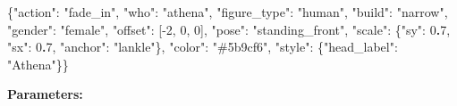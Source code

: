 \documentclass[
  12pt,
  letterpaper,
]{book}
\newenvironment{Shaded}{}{}
\newcommand{\DataTypeTok}[1]{\textcolor[rgb]{0.56,0.13,0.00}{#1}}
\newcommand{\DecValTok}[1]{\textcolor[rgb]{0.25,0.63,0.44}{#1}}
\newcommand{\ErrorTok}[1]{\textcolor[rgb]{1.00,0.00,0.00}{\textbf{#1}}}
\newcommand{\FunctionTok}[1]{\textcolor[rgb]{0.02,0.16,0.49}{#1}}
\newcommand{\OtherTok}[1]{\textcolor[rgb]{0.00,0.44,0.13}{#1}}
\newcommand{\StringTok}[1]{\textcolor[rgb]{0.25,0.44,0.63}{#1}}
\begin{document}
\begin{Shaded}
\begin{Highlighting}[]
\FunctionTok{\{}\DataTypeTok{"action"}\FunctionTok{:} \StringTok{"fade\_in"}\FunctionTok{,} \DataTypeTok{"who"}\FunctionTok{:} \StringTok{"athena"}\FunctionTok{,}
 \DataTypeTok{"figure\_type"}\FunctionTok{:} \StringTok{"human"}\FunctionTok{,} \DataTypeTok{"build"}\FunctionTok{:} \StringTok{"narrow"}\FunctionTok{,} \DataTypeTok{"gender"}\FunctionTok{:} \StringTok{"female"}\FunctionTok{,}
 \DataTypeTok{"offset"}\FunctionTok{:} \OtherTok{[}\DecValTok{{-}2}\OtherTok{,} \DecValTok{0}\OtherTok{,} \DecValTok{0}\OtherTok{]}\FunctionTok{,} \DataTypeTok{"pose"}\FunctionTok{:} \StringTok{"standing\_front"}\FunctionTok{,}
 \DataTypeTok{"scale"}\FunctionTok{:} \FunctionTok{\{}\DataTypeTok{"sy"}\FunctionTok{:} \DecValTok{0}\ErrorTok{.}\DecValTok{7}\FunctionTok{,} \DataTypeTok{"sx"}\FunctionTok{:} \DecValTok{0}\ErrorTok{.}\DecValTok{7}\FunctionTok{,} \DataTypeTok{"anchor"}\FunctionTok{:} \StringTok{"lankle"}\FunctionTok{\},}
 \DataTypeTok{"color"}\FunctionTok{:} \StringTok{"\#5b9cf6"}\FunctionTok{,}
 \DataTypeTok{"style"}\FunctionTok{:} \FunctionTok{\{}\DataTypeTok{"head\_label"}\FunctionTok{:} \StringTok{"Athena"}\FunctionTok{\}\}}
\end{Highlighting}
\end{Shaded}

\textbf{Parameters:}
\end{document}
